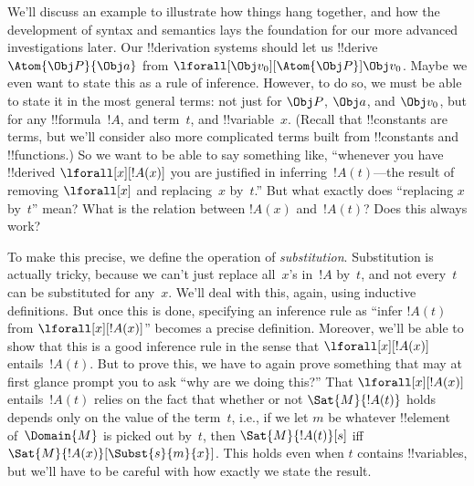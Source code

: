

We'll discuss an example to illustrate how things hang together, and
how the development of syntax and semantics lays the foundation for
our more advanced investigations later. Our !!{derivation} systems should let
us !!{derive} $\Atom{\Obj P}{\Obj a}$ from $\lforall[\Obj
v_0][\Atom{\Obj P}]{\Obj v_0}$. Maybe we even want to state this as a
rule of inference. However, to do so, we must be able to state it in
the most general terms: not just for $\Obj P$, $\Obj a$, and $\Obj
v_0$, but for any !!{formula}~$!A$, and term~$t$, and
!!{variable}~$x$. (Recall that !!{constant}s are terms, but we'll
consider also more complicated terms built from !!{constant}s and
!!{function}s.) So we want to be able to say something like,
``whenever you have !!{derive}d $\lforall[x][!A(x)]$ you are justified
in inferring~$!A(t)$---the result of removing $\lforall[x]$ and
replacing~$x$ by~$t$.'' But what exactly does ``replacing $x$ by~$t$''
mean? What is the relation between $!A(x)$ and~$!A(t)$?  Does this
always work?

To make this precise, we define the operation of \emph{substitution}.
Substitution is actually tricky, because we can't just replace
all~$x$'s in~$!A$ by~$t$, and not every~$t$ can be substituted for
any~$x$. We'll deal with this, again, using inductive definitions. But
once this is done, specifying an inference rule as ``infer $!A(t)$
from $\lforall[x][!A(x)]$'' becomes a precise definition.  Moreover,
we'll be able to show that this is a good inference rule in the sense
that $\lforall[x][!A(x)]$ entails~$!A(t)$. But to prove this, we have
to again prove something that may at first glance prompt you to ask
``why are we doing this?'' That $\lforall[x][!A(x)]$ entails~$!A(t)$
relies on the fact that whether or not $\Sat{M}{!A(t)}$ holds depends
only on the value of the term~$t$, i.e., if we let $m$ be whatever
!!{element} of~$\Domain{M}$ is picked out by~$t$, then
$\Sat{M}{!A(t)}[s]$ iff $\Sat{M}{!A(x)}[\Subst{s}{m}{x}]$. This holds
even when $t$ contains !!{variable}s, but we'll have to be careful
with how exactly we state the result.







